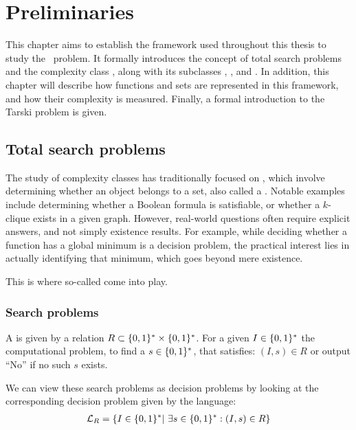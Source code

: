 \setchapterpreamble[u]{\margintoc}
\chapter{Preliminaries}

This chapter aims to establish the framework used throughout this thesis to study the \Tarski\ problem. It formally introduces the concept of total search problems and the complexity class \TFNP, along with its subclasses \PLS, \PPAD, and \EOPL. In addition, this chapter will describe how functions and sets are represented in this framework, and how their complexity is measured. Finally, a formal introduction to the Tarski problem is given.

\section{Total search problems}

The study of complexity classes has traditionally focused on , which involve determining whether an object belongs to a set, also called a . Notable examples include determining whether a Boolean formula is satisfiable, or whether a $k$-clique exists in a given graph. However, real-world questions often require explicit answers, and not simply existence results. For example, while deciding whether a function has a global minimum is a decision problem, the practical interest lies in actually identifying that minimum, which goes beyond mere existence.

This is where so-called  come into play.

\subsection{Search problems}

\begin{definition}
    A  is given by a relation $R\subset \{0, 1\}^* \times \{0, 1\}^*$. For a given  $I\in \{0, 1\}^*$ the computational problem, to find a  $s \in \{0, 1\}^*$, that satisfies: $(I, s) \in R$ or output ``No'' if no such $s$ exists.
\end{definition}

We can view these search problems as decision problems by looking at the corresponding decision problem given by the language:
\begin{align*}
    \mathcal{L}_R = \{ I \in \{0, 1\}^* |\ \exists s \in \{0, 1\}^* : (I, s) \in R\}
\end{align*}

